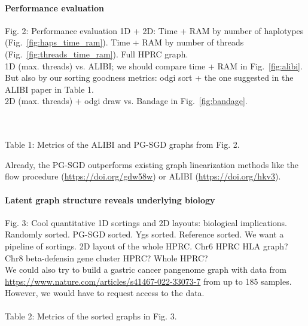 \documentclass{bioinfo}
\theoremstyle{definition}
\begin{document}


    \paragraph{Performance evaluation}
    Fig. 2: Performance evaluation 1D + 2D: Time + RAM by number of haplotypes (Fig.~\ref{fig:haps_time_ram}). Time + RAM by number of threads (Fig.~\ref{fig:threads_time_ram}). Full HPRC graph.
    \\
    1D (max. threads) vs. ALIBI; we should compare time + RAM in Fig.~\ref{fig:alibi}.
    But also by our sorting goodness metrics: odgi sort + the one suggested in the ALIBI paper in Table 1.
    \\
    2D (max. threads) + odgi draw vs. Bandage in Fig.~\ref{fig:bandage}.
    
    \\
    \\
    Table 1: Metrics of the ALIBI and PG-SGD graphs from Fig. 2.
    
    Already, the PG-SGD outperforms existing graph linearization methods like the flow procedure (\url{https://doi.org/gdw58w}) or ALIBI (\url{https://doi.org/hkv3}).

    \paragraph{Latent graph structure reveals underlying biology}
    Fig. 3: Cool quantitative 1D sortings and 2D layouts: biological implications.
    Randomly sorted. PG-SGD sorted. Ygs sorted. Reference sorted.
    We want a pipeline of sortings. 2D layout of the whole HPRC.
    Chr6 HPRC HLA graph? Chr8 beta-defensin gene cluster HPRC? Whole HPRC?
    \\
    We could also try to build a gastric cancer pangenome graph with data from \url{https://www.nature.com/articles/s41467-022-33073-7} from up to 185 samples.
    However, we would have to request access to the data.
    \\
    \\
    
    Table 2: Metrics of the sorted graphs in Fig. 3.
    
\end{document}
